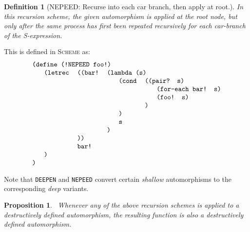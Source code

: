\documentclass[11pt]{article} %
\newtheorem{propo}{Proposition}
\newcommand{\eeq}{\end{equation}}
\newcommand{\beql}[1]{\begin{equation}\label{#1}}
\newcommand{\autletter}[1]{$#1$}
\newcommand{\automorphismlet}[1]{automorphism~\autletter{#1}}
\newcommand{\proglangname}[1]{{\textsc{#1}}}
\newcommand{\scmsym}[1]{{\tt{#1}}}
\newcommand{\scmcode}[1]{{\tt{#1}}}
\newtheorem{definition}[theorem]{Definition}
\newenvironment{scmdefinefun7}{\begin{tabular}{l l l l l l l}}{\end{tabular}}
\begin{document}
\begin{definition}[{NEPEED: Recurse into each car branch, then apply at root.}]
\normalfont
In this recursion scheme, the given automorphism %
is applied at the root node, but only {\em after} the same process
has first been repeated recursively for each car-branch of the S-expression.
\end{definition}

This is defined in \proglangname{Scheme} as:
\beql{definerecschemeSD1} 
\begin{scmdefinefun7}
\multicolumn{7}{l}{\scmcode{(define (!NEPEED foo!)}}\\
 & \scmcode{(letrec} & \scmcode{((bar!} & \multicolumn{4}{l}{\scmcode{(lambda (s)}}\\
 & & & & \scmcode{(cond} & \multicolumn{2}{l}{\scmcode{((pair? s)}}\\
 & & & & & & \scmcode{(for-each bar! s)}\\
 & & & & & & \scmcode{(foo! s)}\\
 & & & & & \scmcode{)}\\ %
 & & & & \scmcode{)}\\ %
 & & & & \scmcode{s}\\
 & & & \scmcode{)}\\ %
 & & \scmcode{))}\\ %
 & & \scmcode{bar!}\\ 
 & \scmcode{)}\\  %
\scmcode{)}\\ %
\end{scmdefinefun7}
\eeq

Note that \scmsym{DEEPEN} and \scmsym{NEPEED}
convert certain \textit{shallow} automorphisms to the
corresponding \textit{deep} variants.


\begin{propo}~\label{recschemepropo1}
Whenever any of the above recursion schemes is applied to a destructively 
defined automorphism, the resulting function is also a destructively
defined automorphism.
\end{propo}
\end{document}
